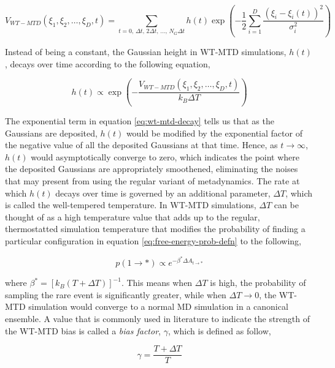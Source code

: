 \begin{spacing}{2.0}
    \begin{equation}
        V_{WT-MTD}(\xi_1,\xi_2,\ldots,\xi_D,t) = \sum_{t=0,\,\Delta t,\,2\Delta t,\,\ldots,\,N_G\Delta t} 
            h(t)\exp\left(-\frac{1}{2}\sum_{i=1}^D\frac{\left(\xi_i-\xi_i(t)\right)^2}{\sigma_i^2}\right)
        \label{eq:wt-mtd-potential}
    \end{equation}

    Instead of being a constant, the Gaussian height in WT-MTD simulations, $h(t)$, decays over time according to the following equation,

    \begin{equation}
        h(t) \propto \exp\left(-\frac{V_{WT-MTD}(\xi_1,\xi_2,\ldots,\xi_D,t)}{k_B\Delta T}\right)
        \label{eq:wt-mtd-decay}
    \end{equation}

    The exponential term in equation \ref{eq:wt-mtd-decay} tells us that as the Gaussians are deposited, $h(t)$ would be modified by
    the exponential factor of the negative value of all the deposited Gaussians at that time. Hence, as $t\to\infty$, $h(t)$ would
    asymptotically converge to zero, which indicates the point where the deposited Gaussians are appropriately smoothened, eliminating
    the noises that may present from using the regular variant of metadynamics. The rate at which $h(t)$ decays over time is governed
    by an additional parameter, $\Delta T$, which is called the well-tempered temperature. In WT-MTD simulations, $\Delta T$ can be
    thought of as a high temperature value that adds up to the regular, thermostatted simulation temperature that modifies the 
    probability of finding a particular configuration in equation \ref{eq:free-energy-prob-defn} to the following,

    \begin{equation}
        p(1\to *) \propto e^{-\beta^*\Delta A_{t\to *}}
    \end{equation}

    \noindent where $\beta^* = \left[k_B(T + \Delta T)\right]^{-1}$. This means when $\Delta T$ is high, the probability of sampling
    the rare event is significantly greater, while when $\Delta T \to 0$, the WT-MTD simulation would converge to a normal MD simulation
    in a canonical ensemble. A value that is commonly used in literature to indicate the strength of the WT-MTD bias is called a 
    \textsl{bias factor}, $\gamma$, which is defined as follow, \cite{P-JCTC-2016-v12-Sun}

    \begin{equation}
        \gamma = \frac{T + \Delta T}{T}
    \end{equation}


\end{spacing}

